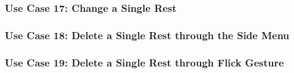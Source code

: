 
  \subsubsection{Use Case 17: Change a Single Rest}


  \subsubsection{Use Case 18: Delete a Single Rest through the Side Menu}



  \subsubsection{Use Case 19: Delete a Single Rest through Flick Gesture}

